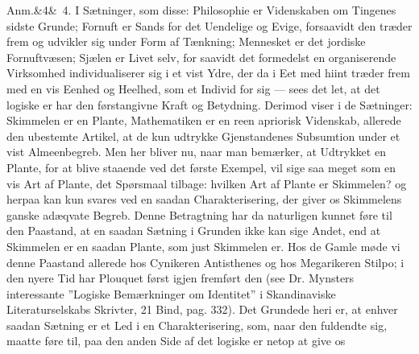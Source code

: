 \documentclass[12pt]{book}
\def\sperr#1{#1}%
\def\textit#1{#1}%
\def\emph#1{#1}%
\newcommand{\sperr}[1]{\textls[180]{#1}}
\newcommand{\anm}[1]{%
  \par\vspace{0.5\baselineskip}%
  \noindent\hspace{\parindent}\sperr{Anm.}\ifx&#1&\else~\textit{#1}.\fi
  \enspace\ignorespaces
}
\newcommand{\opage}[1]{\marginnote{\footnotesize\textit{[#1]}}}
\begin{document}
\anm{4} I Sætninger, som disse: Philosophie er Videnskaben om Tingenes sidste
Grunde; Fornuft er Sands for det Uendelige og Evige, forsaavidt den træder frem
og udvikler sig under Form af Tænkning; Mennesket er det jordiske Fornuftvæsen;
Sjælen er Livet selv, for%
\opage{261}saavidt det formedelst en organiserende Virksomhed individualiserer sig i et
vist Ydre, der da i Eet med hiint træder frem med en vis Eenhed og Heelhed, som
et Individ for sig --- sees det let, at det logiske \emph{er} har den
førstangivne Kraft og Betydning. Derimod viser i de Sætninger: Skimmelen er en
Plante, Mathematiken er en reen apriorisk Videnskab, allerede den ubestemte
Artikel, at de kun udtrykke Gjenstandenes Subsumtion under et vist
Almeenbegreb. Men her bliver nu, naar man bemærker, at Udtrykket \emph{en}
Plante, for at blive staaende ved det første Exempel, vil sige saa meget som en
vis Art af Plante, det Spørsmaal tilbage: hvilken Art af Plante er Skimmelen? og
herpaa kan kun svares ved en saadan Charakterisering, der giver os Skimmelens
ganske adæqvate Begreb. Denne Betragtning har da naturligen kunnet føre til den
Paastand, at en saadan Sætning i Grunden ikke kan sige Andet, end at Skimmelen
er en saadan Plante, som just Skimmelen er. Hos de Gamle møde vi denne Paastand
allerede hos Cynikeren Antisthenes og hos Megarikeren Stilpo; i den nyere Tid
har Plouquet først igjen fremført den (see Dr. Mynsters interessante ''Logiske
Bemærkninger om Identitet'' i Skandinaviske Literaturselskabs Skrivter, 21 Bind,
pag. 332). Det Grundede heri er, at enhver saadan Sætning er et Led i en
Charakterisering, som, naar den fuldendte sig, maatte føre til, paa den anden
Side af det logiske \emph{er} netop at give os
\end{document}
